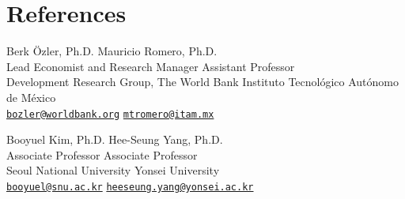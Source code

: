 \documentclass[a4paper, 10pt]{article}
\renewenvironment{itemize}{
  \begin{list}{}
    { \setlength{\itemsep}{5pt}
      \setlength{\parsep}{0pt}
      \setlength{\topsep}{0pt}
      \setlength{\leftmargin}{0em} } }{
  \end{list}}
\begin{document}
\section*{References}
\begin{itemize}
  \item Berk Özler, Ph.D. \hfill Mauricio Romero, Ph.D. \\
  Lead Economist and Research Manager \hfill Assistant Professor \\
  Development Research Group, The World Bank \hfill Instituto Tecnológico Autónomo de México \\
  \texttt{\href{mailto:bozler@worldbank.org}{bozler@worldbank.org}} \hfill \texttt{\href{mailto:mtromero@itam.mx}{mtromero@itam.mx}}
  \item Booyuel Kim, Ph.D. \hfill Hee-Seung Yang, Ph.D. \\
  Associate Professor \hfill Associate Professor \\
  Seoul National University \hfill Yonsei University \\
  \texttt{\href{mailto:booyuel@snu.ac.kr}{booyuel@snu.ac.kr}} \hfill \texttt{\href{mailto:heeseung.yang@yonsei.ac.kr}{heeseung.yang@yonsei.ac.kr}}
\end{itemize}
\end{document}
